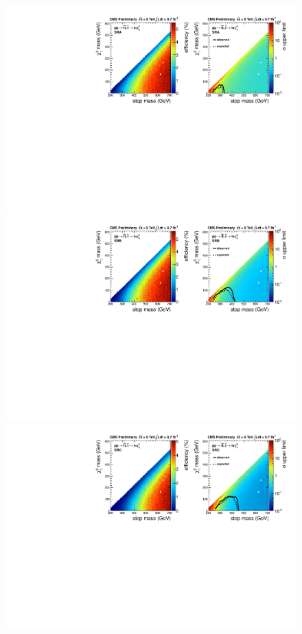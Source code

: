 \begin{figure}[hbt]
  \begin{center}
        \includegraphics[width=1.\linewidth]{plots/T2tt_SRA.pdf}
        \includegraphics[width=1.\linewidth]{plots/T2tt_SRB.pdf}
        \includegraphics[width=1.\linewidth]{plots/T2tt_SRC.pdf}

\end{center}
\end{figure}
